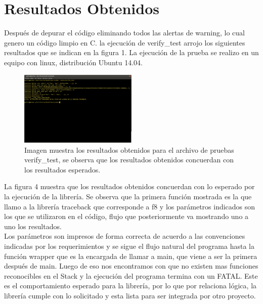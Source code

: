 \documentclass[twocolumn,11pts]{IEEEtran}
\begin{document}
\section{Resultados Obtenidos}
Después de depurar el código eliminando todos las alertas de warning, lo cual genero un código limpio en C. la ejecución de verify\_test arrojo los siguientes resultados que se indican en la figura 1. La ejecución de la prueba 	se realizo en un equipo con linux, distribución Ubuntu 14.04.
\\
\begin{figure}
  \centering
    \includegraphics[width=0.5\textwidth]{imagenes/test.png}
  \caption{Imagen muestra los resultados obtenidos para el archivo de pruebas verify\_test, se observa que los resultados obtenidos concuerdan con los resultados esperados.}
  \label{Fig 4}
\end{figure}
La figura 4 muestra que los resultados obtenidos concuerdan con lo esperado por la ejecución de la librería. Se observa que la primera función mostrada es la que llamo a la librería traceback que corresponde a f8 y los parámetros indicados son los que se utilizaron en el código, flujo que posteriormente va mostrando uno a uno los resultados. \\
Los parámetros son impresos de forma correcta de acuerdo a las convenciones indicadas por los requerimientos y se sigue el flujo natural del programa hasta la función wrapper que es la encargada de llamar a main, que viene a ser la primera después de main. Luego de eso nos encontramos con que no existen mas funciones reconocibles en el Stack y la ejecución del programa termina con un FATAL.
Este es el comportamiento esperado para la librería, por lo que por relaciona lógica, la librería cumple con lo solicitado y esta lista para ser integrada por otro proyecto.
\end{document}
